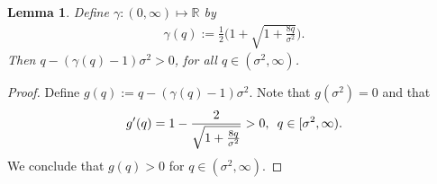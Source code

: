 \documentclass[11pt]{article} %
\newtheorem{lemma}[theorem]{Lemma}
\def\R{\mathbb{R}}
\numberwithin{komcounter}{section}
\begin{document}
\begin{lemma} \label{nec_inequality} 
Define $\gamma:(0,\infty) \mapsto \R$ by
\begin{align} \label{gammaq}
\gamma(q) := \frac{1}{2} \bigg( 1 + \sqrt{1+\frac{8q}{\sigma^2}} \bigg).
\end{align} 
Then $q-(\gamma(q)-1)\sigma^2>0$, for all $q \in (\sigma^2,\infty)$.
\end{lemma}
\begin{proof}
Define $g(q) := q-(\gamma(q)-1)\sigma^2$. Note that $g(\sigma^2)=0$ and that
\begin{align*}
    g'(q)=1-\frac{2}{\sqrt{1+\frac{8q}{\sigma^2}}}>0, \enskip q\in[\sigma^2,\infty).
\end{align*}
We conclude that $g(q)>0$ for $q\in (\sigma^2,\infty)$.
\end{proof}
\end{document}
